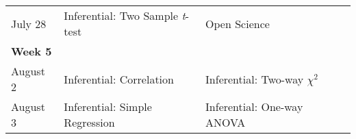 \documentclass[
]{book}
\begin{document}
\begin{longtable}[]{@{}llll@{}}
\begin{minipage}[t]{0.09\columnwidth}
July 28\strut
\end{minipage} & \begin{minipage}[t]{0.32\columnwidth}\raggedright
Inferential: Two Sample \emph{t}-test\strut
\end{minipage} & \begin{minipage}[t]{0.29\columnwidth}\raggedright
Open Science\strut
\end{minipage} & \begin{minipage}[t]{0.18\columnwidth}\raggedright
\strut
\end{minipage}\tabularnewline
\begin{minipage}[t]{0.09\columnwidth}\raggedright
\textbf{Week 5}\strut
\end{minipage} & \begin{minipage}[t]{0.32\columnwidth}\raggedright
\strut
\end{minipage} & \begin{minipage}[t]{0.29\columnwidth}\raggedright
\strut
\end{minipage} & \begin{minipage}[t]{0.18\columnwidth}\raggedright
\strut
\end{minipage}\tabularnewline
\begin{minipage}[t]{0.09\columnwidth}\raggedright
August 2\strut
\end{minipage} & \begin{minipage}[t]{0.32\columnwidth}\raggedright
Inferential: Correlation\strut
\end{minipage} & \begin{minipage}[t]{0.29\columnwidth}\raggedright
Inferential: Two-way \(\chi^2\)\strut
\end{minipage} & \begin{minipage}[t]{0.18\columnwidth}\raggedright
\strut
\end{minipage}\tabularnewline
\begin{minipage}[t]{0.09\columnwidth}\raggedright
August 3\strut
\end{minipage} & \begin{minipage}[t]{0.32\columnwidth}\raggedright
Inferential: Simple Regression\strut
\end{minipage} & \begin{minipage}[t]{0.29\columnwidth}\raggedright
Inferential: One-way ANOVA\strut
\end{minipage} & \begin{minipage}[t]{0.18\columnwidth}\raggedright
\strut
\end{minipage}\tabularnewline

\end{longtable}
\end{document}
